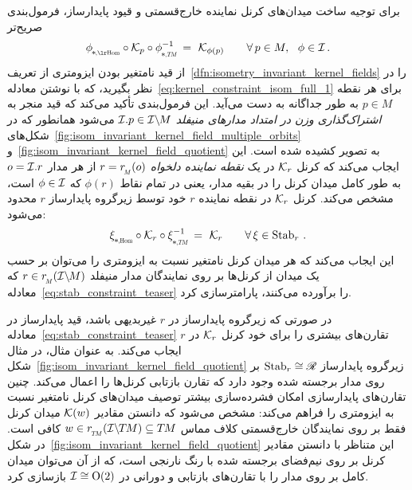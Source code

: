 برای توجیه ساخت میدان‌های کرنل نماینده خارج‌قسمتی و قیود پایدارساز، فرمول‌بندی صریح‌تر
\begin{align}\label{eq:isom_invariant_kernel_constraint_explicit}
    \dphiHom \!\circ \Kp \circ \dphiTMinv \,=\ \Kphip \qquad \forall\, p\in M,\ \  \phi\in\I \,.
\end{align}
از قید نامتغیر بودن ایزومتری از تعریف~\ref{dfn:isometry_invariant_kernel_fields} را در نظر بگیرید، که با نوشتن معادله~\eqref{eq:kernel_constraint_isom_full_1} برای هر نقطه $p\in M$ به طور جداگانه به دست می‌آید.
این فرمول‌بندی تأکید می‌کند که قید منجر به \emph{اشتراک‌گذاری وزن در امتداد مدارهای منیفلد} $\mathcal{I}.p \in \mathcal{I}\backslash\mkern-1.5mu M$ می‌شود همانطور که در شکل‌های~\ref{fig:isom_invariant_kernel_field_multiple_orbits} و~\ref{fig:isom_invariant_kernel_field_quotient} به تصویر کشیده شده است.
این ایجاب می‌کند که کرنل $\mathcal{K}_r$ در یک \emph{نقطه نماینده دلخواه} $r = \rM(o)$ از هر مدار $o = \mathcal{I}.r$ به طور کامل میدان کرنل را در بقیه مدار، یعنی در تمام نقاط $\phi(r)$ که $\phi\in\mathcal{I}$ است، مشخص می‌کند.
کرنل $\mathcal{K}_r$ در نقطه نماینده $r$ خود توسط زیرگروه پایدارساز $r$ محدود می‌شود:
\begin{align}\label{eq:stab_constraint_teaser}
    \dxiHom \!\circ \Kr \circ \dxiTMinv \,=\ \Kr \qquad \forall\, \xi\in\Stab{r} \,.
\end{align}
این ایجاب می‌کند که هر میدان کرنل نامتغیر نسبت به ایزومتری را می‌توان بر حسب یک میدان از کرنل‌ها بر روی نمایندگان مدار منیفلد $r \in \rM(\IM)$ که معادله~\eqref{eq:stab_constraint_teaser} را برآورده می‌کنند، پارامترسازی کرد.

در صورتی که زیرگروه پایدارساز در $r$ غیربدیهی باشد، قید پایدارساز در معادله~\eqref{eq:stab_constraint_teaser} تقارن‌های بیشتری را برای خود کرنل $\mathcal{K}_r$ در $r$ ایجاب می‌کند.
به عنوان مثال، در مثال شکل~\ref{fig:isom_invariant_kernel_field_quotient} زیرگروه پایدارساز ${\operatorname{Stab}_{r} \cong \mathscr{R}}$ بر روی مدار برجسته شده وجود دارد که تقارن بازتابی کرنل‌ها را اعمال می‌کند.
چنین تقارن‌های پایدارسازی امکان فشرده‌سازی بیشتر توصیف میدان‌های کرنل نامتغیر نسبت به ایزومتری را فراهم می‌کند:
مشخص می‌شود که دانستن مقادیر $\mathcal{K}(w)$ میدان کرنل فقط بر روی نمایندگان خارج‌قسمتی کلاف مماس $w \in \rTM(\ITM) \subseteq \TM$ کافی است.
در شکل~\ref{fig:isom_invariant_kernel_field_quotient} این متناظر با دانستن مقادیر کرنل بر روی نیم‌فضای برجسته شده با رنگ نارنجی است، که از آن می‌توان میدان کامل بر روی مدار را با تقارن‌های بازتابی و دورانی در $\mathcal{I}\cong\operatorname{O}(2)$ بازسازی کرد.



